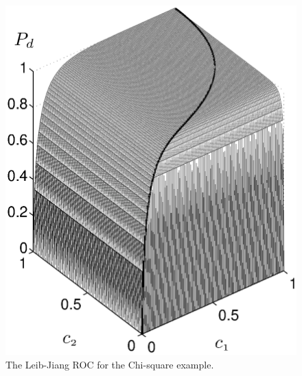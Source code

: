 \documentclass[12pt,journal,a4paper,twoside,onecolumn]{IEEEtran}
\begin{document}
\begin{spacing}{2.5}
\begin{figure}[!t]
\centering
\includegraphics[width=12cm]{chi2ROC.eps}
\caption{The Leib-Jiang ROC for the Chi-square example.}
\label{pic: LJS for chisquare}
\end{figure}



\end{spacing}
\end{document}

